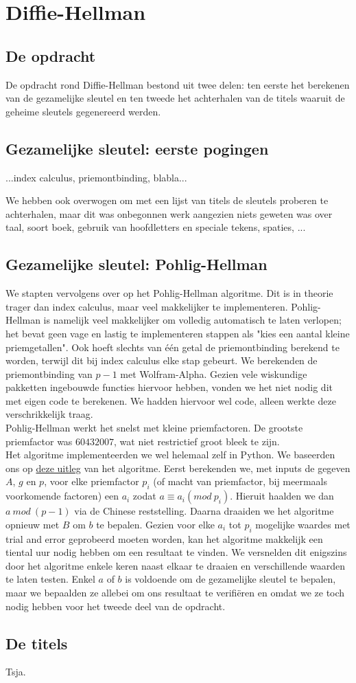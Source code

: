 \section{Diffie-Hellman}
\subsection{De opdracht}
De opdracht rond Diffie-Hellman bestond uit twee delen: ten eerste het berekenen van de gezamelijke sleutel en ten tweede het achterhalen van de titels waaruit de geheime sleutels gegenereerd werden.

\subsection{Gezamelijke sleutel: eerste pogingen}
...index calculus, priemontbinding, blabla...

We hebben ook overwogen om met een lijst van titels de sleutels proberen te achterhalen, maar dit was onbegonnen werk aangezien niets geweten was over taal, soort boek, gebruik van hoofdletters en speciale tekens, spaties, ...

\subsection{Gezamelijke sleutel: Pohlig-Hellman}
We stapten vervolgens over op het Pohlig-Hellman algoritme. Dit is in theorie trager dan index calculus, maar veel makkelijker te implementeren. Pohlig-Hellman is namelijk veel makkelijker om volledig automatisch te laten verlopen; het bevat geen vage en lastig te implementeren stappen als "kies een aantal kleine priemgetallen". Ook hoeft slechts van \'e\'en getal de priemontbinding berekend te worden, terwijl dit bij index calculus elke stap gebeurt. We berekenden de priemontbinding van $p-1$ met Wolfram-Alpha. Gezien vele wiskundige pakketten ingebouwde functies hiervoor hebben, vonden we het niet nodig dit met eigen code te berekenen. We hadden hiervoor wel code, alleen werkte deze verschrikkelijk traag.  \\Pohlig-Hellman werkt het snelst met kleine priemfactoren. De grootste priemfactor was $60432007$, wat niet restrictief groot bleek te zijn.  \\ Het algoritme implementeerden we wel helemaal zelf in Python. We baseerden ons op \href{https://www.youtube.com/watch?v=BXFNYVmdtJU}{deze uitleg} van het algoritme. Eerst berekenden we, met inputs de gegeven $A$, $g$ en $p$, voor elke priemfactor $p_i$ (of macht van priemfactor, bij meermaals voorkomende factoren) een $a_i$ zodat $a \equiv a_i (mod\ p_i)$. Hieruit haalden we dan $a\ mod \ (p-1)$ via de Chinese reststelling. Daarna draaiden we het algoritme opnieuw met $B$ om $b$ te bepalen. Gezien voor elke $a_i$ tot $p_i$ mogelijke waardes met trial and error geprobeerd moeten worden, kan het algoritme makkelijk een tiental uur nodig hebben om een resultaat te vinden. We versnelden dit enigszins door het algoritme enkele keren naast elkaar te draaien en verschillende waarden te laten testen. Enkel $a$ of $b$ is voldoende om de gezamelijke sleutel te bepalen, maar we bepaalden ze allebei om ons resultaat te verifi\"eren en omdat we ze toch nodig hebben voor het tweede deel van de opdracht.

\subsection{De titels}
Tsja.
